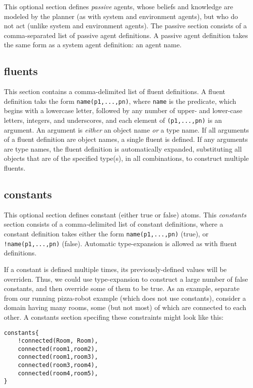 \documentclass{article}
\begin{document}
This optional section defines \emph{passive} agents, whose beliefs and knowledge are
modeled by the planner (as with system and environment agents), but
who do not act (unlike system and environment agents).
The passive section consists of a comma-separated list of passive agent
definitions. A passive agent definition takes the same form as a system
agent definition: an agent name.



\subsection{fluents}

This section contains a comma-delimited list of fluent definitions. A fluent
definition taks the form \verb|name(p1,...,pn)|, where \verb|name| is the
predicate, which begins with a lowercase letter, followed by any number of
upper- and lower-case letters, integers, and underscores, and each element of
\verb|(p1,...,pn)| is an argument. An argument is
\emph{either} an object name \emph{or} a type name. If all arguments
of a fluent definition are object names, a single fluent is defined. If any
arguments are type names, the fluent definition is automatically expanded,
substituting all objects that are of the specified type(s), in all combinations, to
construct multiple fluents.



\subsection{constants}

This optional section defines constant (either true or false) atoms. This
\emph{constants} section consists of a comma-delimited list of constant
definitions, where a constant definition takes either the form
\verb|name(p1,...,pn)| (true), 
or
\verb|!name(p1,...,pn)| (false).
Automatic type-expansion is allowed as with fluent definitions.

If a constant is defined multiple times, its previously-defined values will be
overriden. Thus, we could use type-expansion to construct
a large number of false constants, and then
override some of them to be true. As an example, separate from our
running pizza-robot example (which does not use constants), consider a domain
having many rooms, some (but not most) of which are connected to each other.
A constants section specifing these constraints might look like this:

\begin{verbatim}
constants{
    !connected(Room, Room),
    connected(room1,room2),
    connected(room1,room3),
    connected(room3,room4),
    connected(room4,room5),
}
\end{verbatim}
\end{document}
